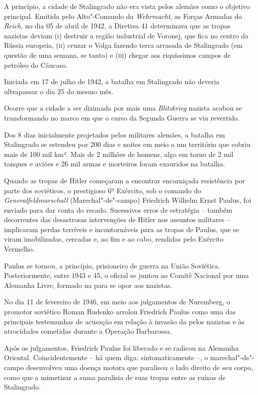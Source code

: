 A princípio, a cidade de Stalingrado não era vista pelos alemães como o
objetivo principal. Emitida pelo Alto"-Comando da \emph{Wehrmacht}, as
Forças Armadas do  \emph{Reich}, no dia 05 de abril de 1942, a
Diretiva 41 determinava que as tropas nazistas deviam \textsc{(i)}
destruir a região industrial de Voronej, que fica no centro da Rússia
europeia, \textsc{(ii)} cruzar o Volga fazendo terra arrasada de
Stalingrado (em questão de uma semana, se tanto) e \textsc{(iii)} chegar
aos riquíssimos campos de petróleo do Cáucaso.

Iniciada em 17 de julho de 1942, a batalha em Stalingrado não deveria
ultrapassar o dia 25 do mesmo mês.

Ocorre que a cidade a ser dizimada por mais uma \emph{Blitzkrieg}
nazista acabou se transformando no marco em que o curso da Segunda
Guerra se viu revertido.

Dos 8 dias inicialmente projetados pelos militares alemães, a batalha em
Stalingrado se estendeu por 200 dias e noites em meio a um território
que cobriu mais de 100 mil km². Mais de 2 milhões de homens, algo em
torno de 2 mil tanques e aviões e 26 mil armas e morteiros foram
exauridos na batalha.

Quando as tropas de Hitler começaram a encontrar encarniçada resistência
por parte dos soviéticos, o prestigioso 6º Exército, sob o comando do
\emph{Generalfeldmarschall} (Marechal"-de"-campo) Friedrich Wilhelm Ernst
Paulus, foi enviado para dar conta do recado. Sucessivos erros de
estratégia -- também decorrentes das desastrosas intervenções de Hitler
nos assuntos militares -- implicaram perdas terríveis e incontornáveis
para as tropas de Paulus, que se viram imobilizadas, cercadas e, ao fim
e ao cabo, rendidas pelo Exército Vermelho.

Paulus se tornou, a princípio, prisioneiro de guerra na União Soviética.
Posteriormente, entre 1943 e 45, o oficial se juntou ao Comitê Nacional
por uma Alemanha Livre, formado na  para se opor aos nazistas.

No dia 11 de fevereiro de 1946, em meio aos julgamentos de Nuremberg, o
promotor soviético Roman Rudenko arrolou Friedrich Paulus como uma das
principais testemunhas de acusação em relação à invasão da  pelos
nazistas e às atrocidades cometidas durante a Operação Barbarossa.

Após os julgamentos, Friedrich Paulus foi liberado e se radicou na
Alemanha Oriental. Coincidentemente -- há quem diga: sintomaticamente
--, o marechal"-de"-campo desenvolveu uma doença motora que paralisou o
lado direito de seu corpo, como que a mimetizar a suma paralisia de suas
tropas entre as ruínas de Stalingrado.

